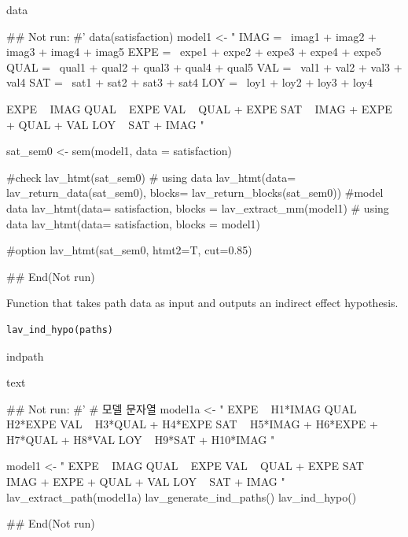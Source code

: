\documentclass[a4paper]{book}
\begin{document}
%
\begin{Value}
data
\end{Value}
%
\begin{Examples}
\begin{ExampleCode}

## Not run: 
#'
data(satisfaction)
model1 <- "
IMAG =~ imag1 + imag2 + imag3 + imag4 + imag5
EXPE =~ expe1 + expe2 + expe3 + expe4 + expe5
QUAL =~ qual1 + qual2 + qual3 + qual4 + qual5
VAL =~ val1 + val2 + val3 + val4
SAT =~ sat1 + sat2 + sat3 + sat4
LOY =~ loy1 + loy2 + loy3 + loy4

EXPE ~ IMAG
QUAL ~ EXPE
VAL ~  QUAL + EXPE
SAT ~ IMAG + EXPE + QUAL + VAL
LOY ~ SAT + IMAG
"

sat_sem0 <- sem(model1, data = satisfaction)

#check
lav_htmt(sat_sem0)
# using data
lav_htmt(data= lav_return_data(sat_sem0), blocks= lav_return_blocks(sat_sem0))
#model data
lav_htmt(data= satisfaction, blocks =  lav_extract_mm(model1)%
# using data
lav_htmt(data= satisfaction, blocks = model1)

#option
lav_htmt(sat_sem0, htmt2=T, cut=0.85)



## End(Not run)

\end{ExampleCode}
\end{Examples}
%
\begin{Description}
Function that takes path data as input and outputs an indirect effect hypothesis.
\end{Description}
%
\begin{Usage}
\begin{verbatim}
lav_ind_hypo(paths)
\end{verbatim}
\end{Usage}
%
\begin{Arguments}
\begin{ldescription}
\item[\code{paths}] indpath
\end{ldescription}
\end{Arguments}
%
\begin{Value}
text
\end{Value}
%
\begin{Examples}
\begin{ExampleCode}

## Not run: 
#'
# 모델 문자열
model1a <- "
EXPE ~ H1*IMAG
QUAL ~ H2*EXPE
VAL ~ H3*QUAL + H4*EXPE
SAT ~ H5*IMAG + H6*EXPE + H7*QUAL + H8*VAL
LOY ~ H9*SAT + H10*IMAG
"

model1 <- "
EXPE ~ IMAG
QUAL ~ EXPE
VAL ~ QUAL + EXPE
SAT ~ IMAG + EXPE + QUAL + VAL
LOY ~ SAT + IMAG
"
lav_extract_path(model1a)%
  lav_generate_ind_paths() %
  lav_ind_hypo()


## End(Not run)

\end{ExampleCode}
\end{Examples}
\end{document}
